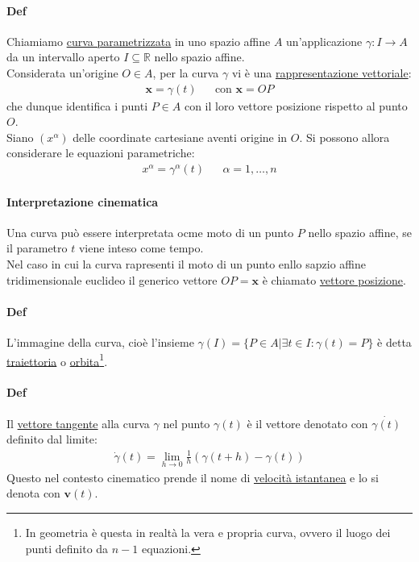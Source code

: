 \paragraph{Def} Chiamiamo \underline{curva parametrizzata} in uno spazio affine $A$ un'applicazione $\gamma \colon I \to A$ da un intervallo aperto $I\subseteq \mathbb{R}$ nello spazio affine.\\
Considerata un'origine $O\in A$, per la curva $\gamma$ vi è una \underline{rappresentazione vettoriale}:
\begin{align*}
    \mathbf{x}=\gamma(t)&& \text{con }\mathbf{x}=OP
\end{align*}
che dunque identifica i punti $P\in A$ con il loro vettore posizione rispetto al punto $O$.\\
Siano $(x^\alpha)$ delle coordinate cartesiane aventi origine in $O$. Si possono allora considerare le equazioni parametriche:
\begin{align*}
    x^\alpha= \gamma^\alpha(t) && \alpha=1,\dots, n
\end{align*}
\paragraph{Interpretazione cinematica}Una curva può essere interpretata ocme moto di un punto $P$ nello spazio affine, se il parametro $t$ viene inteso come tempo.\\
Nel caso in cui la curva rapresenti il moto di un punto enllo sapzio affine tridimensionale euclideo il generico vettore $OP=\mathbf{x}$ è chiamato \underline{vettore posizione}.
\paragraph{Def} L'immagine della curva, cioè l'insieme $\gamma(I)=\{P\in A | \exists t \in I: \gamma(t)=P\}$ è detta \underline{traiettoria} o \underline{orbita}\footnote{In geometria è questa in realtà la vera e propria curva, ovvero il luogo dei punti definito da $n-1$ equazioni.}.
\paragraph{Def} Il \underline{vettore tangente} alla curva $\gamma$ nel punto $\gamma(t)$ è il vettore denotato con $\dot{\gamma(t)}$ definito dal limite:
\begin{align*}
    \dot{\gamma}(t)=\lim_{h\to 0}\frac{1}{h}(\gamma(t+h)-\gamma(t))
\end{align*}
Questo nel contesto cinematico prende il nome di \underline{velocità istantanea} e lo si denota con $\mathbf{v}(t)$.
